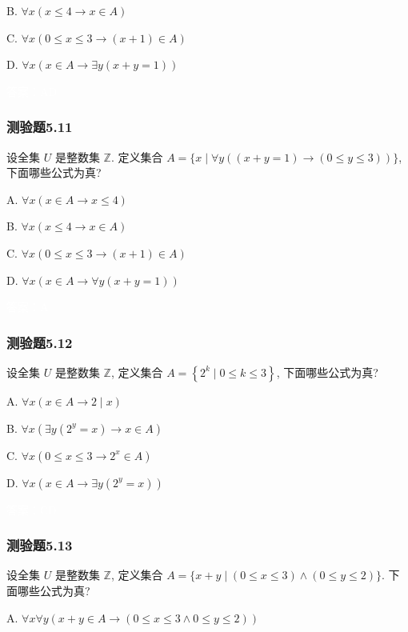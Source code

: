 \documentclass[UTF8, heading=true]{ctexart}
\begin{document}
B. $\forall x(x \leq 4 \rightarrow x \in A)$

C. 
$\forall x(0 \leq x \leq 3 \rightarrow(x+1) \in A)$

D.  $\forall x(x \in A \rightarrow \exists y(x+y=1))$

\textcolor{white}{答案：AD}



\subsubsection{测验题5.11}

设全集 $U$ 是整数集 $\mathbb{Z}$. 定义集合 $A=\{x \mid \forall y((x+y=1) \rightarrow(0 \leq y \leq 3))\}$, 下面哪些公式为真?

A. $\forall x(x \in A \rightarrow x \leq 4)$

B. $\forall x(x \leq 4 \rightarrow x \in A)$

C. $\forall x(0 \leq x \leq 3 \rightarrow(x+1) \in A)$

D. $\forall x(x \in A \rightarrow \forall y(x+y=1))$

\textcolor{white}{答案：A}


\subsubsection{测验题5.12}

设全集 $U$ 是整数集 $\mathbb{Z}$, 定义集合 $A=\left\{2^k \mid 0 \leq k \leq 3\right\}$, 下面哪些公式为真?

A. $\forall x(x \in A \rightarrow 2 \mid x)$

B. $\forall x\left(\exists y\left(2^y=x\right) \rightarrow x \in A\right)$

C. $\forall x\left(0 \leq x \leq 3 \rightarrow 2^x \in A\right)$

D. $\forall x\left(x \in A \rightarrow \exists y\left(2^y=x\right)\right)$

\textcolor{white}{答案：CD}

\subsubsection{测验题5.13}

设全集 $U$ 是整数集 $\mathbb{Z}$, 定义集合 $A=\{x+y \mid(0 \leq x \leq 3) \wedge(0 \leq y \leq 2)\}$. 下面哪些公式为真?

A. $\forall x \forall y(x+y \in A \rightarrow(0 \leq x \leq 3 \wedge 0 \leq y \leq 2))$
\end{document}
